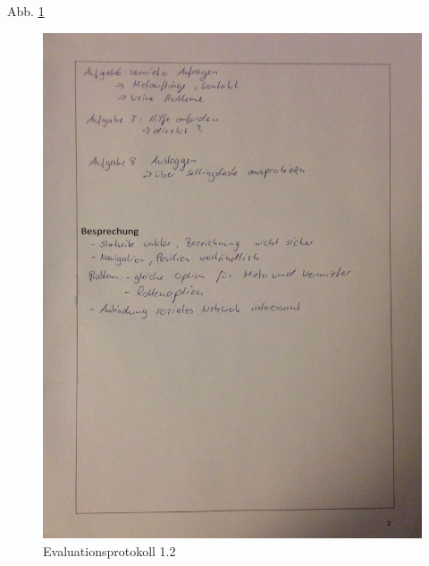 Abb. \ref{fig:evaluation12}
\begin{figure}[H]
\includegraphics[width=1\textwidth]{./images/evaluation/eva12.JPG}
\caption{Evaluationsprotokoll 1.2}
\label{fig:evaluation12}
\end{figure}


